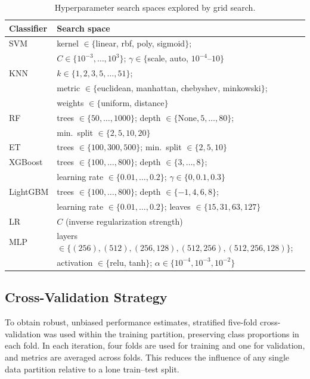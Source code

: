 \begin{table}[t]
\centering
\caption{Hyperparameter search spaces explored by grid search.}
\label{tab:hparams}
\renewcommand{\arraystretch}{1.25}
\footnotesize
\begin{tabular}{@{}ll@{}}
\toprule
\textbf{Classifier} & \textbf{Search space} \\
\midrule
SVM      & kernel $\in\{$linear, rbf, poly, sigmoid$\}$; \\
         & $C \in \{10^{-3},\dots,10^{3}\}$; $\gamma \in \{$scale, auto, $10^{-4}\text{--}10\}$ \\
KNN      & $k \in \{1,2,3,5,\dots,51\}$; \\
         & metric $\in\{$euclidean, manhattan, chebyshev, minkowski$\}$; \\
         & weights $\in\{$uniform, distance$\}$ \\
RF       & trees $\in\{50,\dots,1000\}$; depth $\in\{$None$,5,\dots,80\}$; \\
         & min.\ split $\in\{2,5,10,20\}$ \\
ET       & trees $\in\{100,300,500\}$; min.\ split $\in\{2,5,10\}$ \\
XGBoost  & trees $\in\{100,\dots,800\}$; depth $\in\{3,\dots,8\}$; \\
         & learning rate $\in\{0.01,\dots,0.2\}$; $\gamma \in\{0,0.1,0.3\}$ \\
LightGBM & trees $\in\{100,\dots,800\}$; depth $\in\{-1,4,6,8\}$; \\
         & learning rate $\in\{0.01,\dots,0.2\}$; leaves $\in\{15,31,63,127\}$ \\
LR       & $C$ (inverse regularization strength) \\
MLP      & layers $\in\{(256),(512),(256,128),(512,256),(512,256,128)\}$; \\
         & activation $\in\{$relu, tanh$\}$; $\alpha \in \{10^{-4},10^{-3},10^{-2}\}$ \\
\bottomrule
\end{tabular}
\end{table}

\subsection{Cross-Validation Strategy}
\label{sec:phase2_cv}

To obtain robust, unbiased performance estimates, stratified five-fold
cross-validation was used within the training partition, preserving class
proportions in each fold. In each iteration, four folds are used for training and
one for validation, and metrics are averaged across folds. This reduces the
influence of any single data partition relative to a lone train--test split.


